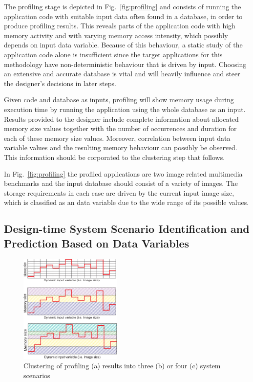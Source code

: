 \documentclass[a4paper,conference]{IEEEtran}
\begin{document}
The profiling stage is depicted in Fig.~\ref{fig:profiling} and consists of running the application code with suitable input data often found in a database, in order to produce profiling results. This reveals parts of the application code with high memory activity and with varying memory access intensity, which possibly depends on input data variable. Because of this behaviour, a static study of the application code alone is insufficient since the target applications for this methodology have non-deterministic behaviour that is driven by input. Choosing an extensive and accurate database is vital and will heavily influence and steer the designer's decisions in later steps. 

Given code and database as inputs, profiling will show memory usage during execution time by running the application using the whole database as an input. Results provided to the designer include complete information about allocated memory size values together with the number of occurrences and duration for each of these memory size values. Moreover, correlation between input data variable values and the resulting memory behaviour can possibly be observed. This information should be corporated to the clustering step that follows. 

In Fig.~\ref{fig:profiling} the profiled applications are two image related multimedia benchmarks and the input database should consist of a variety of images. The storage requirements in each case are driven by the current input image size, which is classified as an data variable due to the wide range of its possible values. 

\subsection{Design-time System Scenario Identification and Prediction Based on Data Variables}

\begin{figure}[!t]
\centering
\includegraphics[width=0.45\textwidth]{Images/1Dclustering.eps}
\caption{Clustering of profiling (a) results into three (b) or four (c) system scenarios}
\label{fig:clustering}
\end{figure}
\end{document}
